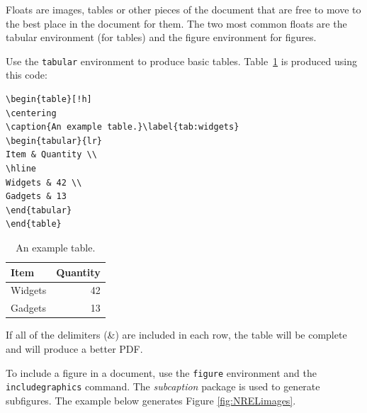 Floats are images, tables or other pieces of the document that are free to move to the best place in the document for them. The two most common floats are the tabular environment (for tables) and the figure environment for figures.

Use the \texttt{tabular} environment to produce basic tables. Table~\ref{tab:widgets} is produced using this code: 

\begin{lstlisting}[language={[LaTeX]Tex}]
\begin{table}[!h]
\centering
\caption{An example table.}\label{tab:widgets}
\begin{tabular}{lr}
Item & Quantity \\
\hline
Widgets & 42 \\
Gadgets & 13
\end{tabular}
\end{table}
\end{lstlisting}

\begin{table}[!h]
\centering
\caption{An example table.}\label{tab:widgets}
\begin{tabular}{lr}
Item & Quantity \\
\hline
Widgets & 42 \\
Gadgets & 13
\end{tabular}
\end{table}

If all of the delimiters (\&) are included in each row, the table will be complete and will produce a better PDF.

To include a figure in a document, use the \texttt{figure} environment and the \texttt{includegraphics} command. The \emph{subcaption} package is used to generate subfigures. The example below generates Figure \ref{fig:NRELimages}.

